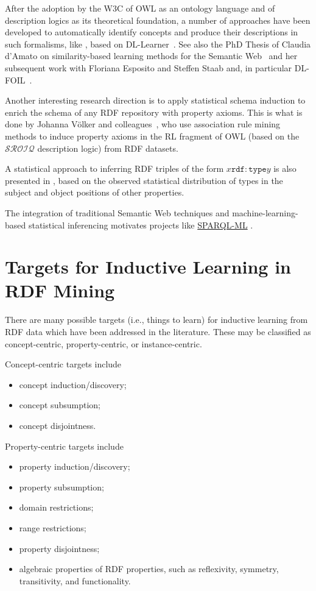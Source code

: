 \documentclass[a4paper]{article}
\newcounter{ex}
\begin{document}
After the adoption by the W3C of OWL as an ontology language and of description logics
as its theoretical foundation, a number of approaches have been developed to automatically
identify concepts and produce their descriptions in such formalisms, like
\cite{HellmannLehmannAuer2009}, based on DL-Learner~\cite{Lehmann2009}.
See also the PhD Thesis of Claudia d'Amato on similarity-based learning
methods for the Semantic Web~\cite{dAmato2007} and her subsequent work with
Floriana Esposito and Steffen Staab and, in particular DL-FOIL~\cite{FanizziDAmatoEsposito2008}.

Another interesting research direction is to apply statistical schema induction
to enrich the schema of any RDF repository with property axioms. This is what is
done by Johanna V\"olker and colleagues~\cite{FleischhackerVoelkerStuckenschmidt2012},
who use association rule mining methods to induce property axioms in the RL fragment
of OWL (based on the $\mathcal{SROIQ}$ description logic) from RDF datasets.

A statistical approach to inferring RDF triples of the form $x \mathtt{rdf:type} y$
is also presented in \cite{PaulheimBizer2013}, based on the observed statistical
distribution of types in the subject and object positions of other properties.

The integration of traditional Semantic Web techniques and machine-learning-based
statistical inferencing motivates projects like
\href{https://files.ifi.uzh.ch/ddis/oldweb/ddis/research/completed-projects/semweb/sparql-ml/}{SPARQL-ML} \cite{KieferBernsteinLocher2008}.

\section{Targets for Inductive Learning in RDF Mining}

There are many possible targets (i.e., things to learn) for inductive learning from RDF data
which have been addressed in the literature.
These may be classified as concept-centric, property-centric, or instance-centric.

Concept-centric targets include
\begin{itemize}
\item concept induction/discovery;
\item concept subsumption;
\item concept disjointness.
\end{itemize}

Property-centric targets include
\begin{itemize}
\item property induction/discovery;
\item property subsumption;
\item domain restrictions;
\item range restrictions;
\item property disjointness;
\item algebraic properties of RDF properties, such as reflexivity, symmetry, transitivity,
  and functionality.
\end{itemize}
\end{document}
